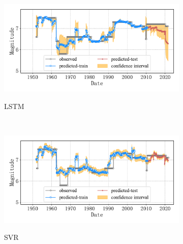 \begin{figure}[!htbp]
  \vspace{-2cm}
  \centering
  \begin{subfigure}[b]{0.45\textwidth}
    \caption{LSTM}
    \includegraphics[width=\textwidth]{Img/chap5_seism/split85/seism_lstm_minyear_1932_maxyear_2021_spanlat_2_spanlon_4_timewindow_120_nextmonth_120_minmag_3.0_split_ratio_0.85_blocks1.pdf}
    \vspace{-1cm}
    \label{fig:seism_lstm_minyear_1932_maxyear_2021_spanlat_2_spanlon_4_timewindow_120_nextmonth_120_minmag_3.0_split_ratio_0.85_blocks1}
  \end{subfigure}
  ~
  \begin{subfigure}[b]{0.45\textwidth}
    \caption{SVR} 
    \includegraphics[width=\textwidth]{Img/chap5_seism/split85/seism_svr_minyear_1932_maxyear_2021_spanlat_2_spanlon_4_timewindow_120_nextmonth_120_minmag_3.0_split_ratio_0.85_blocks1.pdf}
    \vspace{-1cm}
    \label{fig:seism_svr_minyear_1932_maxyear_2021_spanlat_2_spanlon_4_timewindow_120_nextmonth_120_minmag_3.0_split_ratio_0.85_blocks1}
  \end{subfigure}   
  \\
  \begin{subfigure}[b]{0.45\textwidth}

\end{subfigure}
\end{figure}
